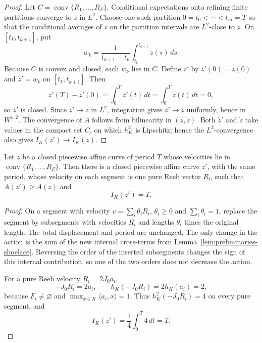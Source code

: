 \begin{proof}
Let \(C=\operatorname{conv}\{R_1,\ldots,R_F\}\). Conditional expectations onto
refining finite partitions converge to \(\dot z\) in \(L^2\). Choose one such
partition \(0=t_0<\cdots<t_m=T\) so that the conditional averages of
\(\dot z\) on the partition intervals are \(L^2\)-close to \(\dot z\). On
\([t_k,t_{k+1}]\), put
\[
  w_k=\frac{1}{t_{k+1}-t_k}\int_{t_k}^{t_{k+1}}\dot z(s)\,ds.
\]
Because \(C\) is convex and closed, each \(w_k\) lies in \(C\). Define \(z'\)
by \(z'(0)=z(0)\) and \(\dot z'=w_k\) on \([t_k,t_{k+1}]\). Then
\[
  z'(T)-z'(0)=\int_0^T\dot z'(t)\,dt=\int_0^T\dot z(t)\,dt=0,
\]
so \(z'\) is closed. Since \(\dot z'\to\dot z\) in \(L^2\), integration gives
\(z'\to z\) uniformly, hence in \(W^{1,2}\). The convergence of \(A\) follows
from bilinearity in \((z,\dot z)\). Both \(\dot z'\) and \(\dot z\) take values
in the compact set \(C\), on which \(h_K^2\) is Lipschitz; hence the
\(L^2\)-convergence also gives \(I_K(z')\to I_K(z)\).
\end{proof}

\begin{lemma}\label{lem:generalized-reeb-splitting}
Let \(z\) be a closed piecewise affine curve of period \(T\) whose velocities
lie in \(\operatorname{conv}\{R_1,\ldots,R_F\}\). Then there is a closed
piecewise affine curve \(z'\), with the same period, whose velocity on each
segment is one pure Reeb vector \(R_i\), such that \(A(z')\geq A(z)\) and
\[
  I_K(z')=T.
\]
\end{lemma}

\begin{proof}
On a segment with velocity \(v=\sum_i\theta_iR_i\), \(\theta_i\ge0\) and
\(\sum_i\theta_i=1\), replace the segment by subsegments with velocities
\(R_i\) and lengths \(\theta_i\) times the original length. The total
displacement and period are unchanged. The only change in the action is the
sum of the new internal cross-terms from
Lemma~\ref{lem:preliminaries-shoelace}. Reversing the order of the inserted
subsegments changes the sign of this internal contribution, so one of the two
orders does not decrease the action.

For a pure Reeb velocity \(R_i=2J_0a_i\),
\[
  -J_0R_i=2a_i,
  \qquad
  h_K(-J_0R_i)=2h_K(a_i)=2,
\]
because \(F_i\neq\varnothing\) and \(\max_{x\in K}\langle a_i,x\rangle=1\).
Thus \(h_K^2(-J_0R_i)=4\) on every pure segment, and
\[
  I_K(z')=\frac14\int_0^T4\,dt=T.
\]
\end{proof}


